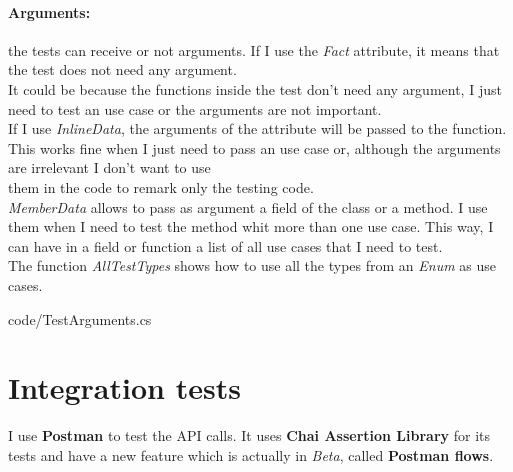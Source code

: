 \paragraph{Arguments:} the tests can receive or not arguments. If I use the \textit{Fact} attribute, it means that the test does not need any argument. \\
    It could be because the functions inside the test don't need any argument, I just need to test an use case or the arguments are not important. \\
    If I use \textit{InlineData}, the arguments of the attribute will be passed to the function. This works fine when I just need to pass an use case or, although the arguments are irrelevant I don't want to use \\
    them in the code to remark only the testing code. \\
    \textit{MemberData} allows to pass as argument a field of the class or a method. I use them when I need to test the method whit more than one use case. This way, I can have in a field or function a list of all use cases that I need to test. \\
    The function \textit{AllTestTypes} shows how to use all the types from an \textit{Enum} as use cases.
    
    {code/TestArguments.cs}

\section{Integration tests}
I use \textbf{Postman} to test the API calls. It uses \textbf{Chai Assertion Library} \cite{Chai} for its tests and have a new feature which is actually in \textit{Beta}, called \textbf{Postman flows}. \\

